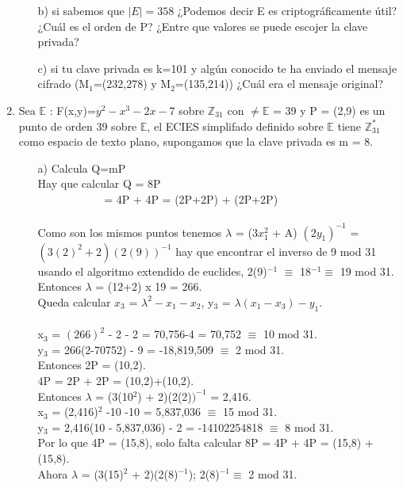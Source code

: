 \documentclass[11pt,letterpaper]{article}
\newcounter{neq}
\begin{document}
\begin{enumerate}
\begin{itemize}
\item[b)] si sabemos que $|E| = 358$ ¿Podemos decir E es criptográficamente útil?
¿Cuál es el orden de P? ¿Entre que valores se puede escojer la clave privada?
\item[c)] si tu clave privada es k=101 y algún conocido te ha enviado el mensaje cifrado (M$_1$=(232,278) y M$_2$=(135,214)) ¿Cuál era el mensaje original?
\end{itemize}
\item Sea $\mathbb{E}$ : F(x,y)=$y^{2}-x^{3}-2x-7$ sobre $\mathbb{Z}_{31}$ con $\neq \mathbb{E}$ = 39 y P = (2,9) es un punto de orden 39 sobre $\mathbb{E}$, el ECIES simplifado definido sobre $\mathbb{E}$ tiene $\mathbb{Z}^{*}_{31}$ como espacio de texto plano, supongamos que la clave privada es m = 8.
\begin{itemize}
\item[a)] Calcula Q=mP\\
Hay que calcular Q = 8P\\$ ~~~~~~~~~~~~~~~~~~~~~~~~~~~$= 4P + 4P = (2P+2P) + (2P+2P)\\\\
Como son los mismos puntos tenemos $\lambda$ = (3$x_{1}^{2}$ + A) $(2y_{1})^{-1}$ = $(3(2)^{2} + 2)(2(9))^{-1}$ hay que encontrar el inverso de 9 mod 31 usando el algoritmo extendido de euclides, 2(9)$^{-1}$ $\equiv$ 18$^{-1} \equiv $ 19 mod 31.\\
Entonces $\lambda$ = (12+2) x 19 = 266.\\
Queda calcular $x_{3}$ = $\lambda^{2} - x_{1} - x_{2}$, y$_3$ = $\lambda(x_{1} - x_{3}) - y_{1}$.
\\
\\x$_{3}$ = $(266)^{2}$ - 2 - 2 = 70,756-4 = 70,752 $\equiv$ 10 mod 31.
\\y$_{3}$ = 266(2-70752) - 9 = -18,819,509 $\equiv$  2 mod 31.\\
Entonces 2P = (10,2).\\
4P = 2P + 2P =  (10,2)+(10,2).\\
Entonces $\lambda$ = (3(10$^{2}$) + 2)(2(2)$)^{-1}$ = 2,416.\\
x$_{3}$ = (2,416)$^{2}$ -10 -10 = 5,837,036 $\equiv$ 15 mod 31.\\
y$_{3}$ = 2,416(10 - 5,837,036) - 2 = -14102254818 $\equiv$ 8 mod 31.\\
Por lo que 4P = (15,8), solo falta calcular 8P = 4P + 4P = (15,8) + (15,8).\\
Ahora $\lambda$ = (3(15)$^{2}$ + 2)(2(8)$^{-1}$); 2(8)$^{-1} \equiv $ 2 mod 31. \\

\end{itemize}
\end{enumerate}
\end{document}
